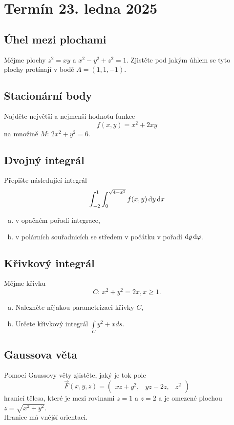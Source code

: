 \section{Termín 23. ledna 2025}

\subsection{Úhel mezi plochami}
Mějme plochy $z^2 = xy$ a $x^2 - y^2 + z^2 = 1$. Zjistěte pod jakým úhlem se tyto plochy protínají v bodě $A = (1, 1, -1)$.

\subsection{Stacionární body}
Najděte největší a nejmenší hodnotu funkce
\[
    f(x, y) = x^2 + 2xy
\]
na množině $M$: $2x^2 + y^2 = 6$.

\subsection{Dvojný integrál}
Přepište následující integrál
\[
    \int_{-2}^{1} \int_{0}^{\sqrt{4-x^2}} f(x,y) \mathop{}\!\mathrm{d} y \mathop{}\!\mathrm{d} x
\]
\begin{enumerate}[a), noitemsep]
    \item v opačném pořadí integrace,
    \item v polárních souřadnicích se středem v počátku v pořadí $\mathop{}\!\mathrm{d} \varrho \mathop{}\!\mathrm{d} \varphi$.
\end{enumerate}

\subsection{Křivkový integrál}
Mějme křivku
\[
    C\text{: } x^2 + y^2 = 2x, x\geq 1 \text{.}
\]
\begin{enumerate}[(a), noitemsep]
    \item Nalezněte nějakou parametrizaci křivky $C$,
    \item Určete křivkový integrál $\underset{C}{\int} y^2 + x ds$.
\end{enumerate}

\subsection{Gaussova věta}
Pomocí Gaussovy věty zjistěte, jaký je tok pole
\[
    \vec{F} (x, y, z) =
    \begin{pmatrix}
        xz + y^2, & yz - 2z, & z^2
    \end{pmatrix}
\]
hranicí tělesa, které je mezi rovinami $z=1$ a $z=2$ a je omezené plochou $z = \sqrt{x^2 + y^2}$. \\
Hranice má vnější orientaci.